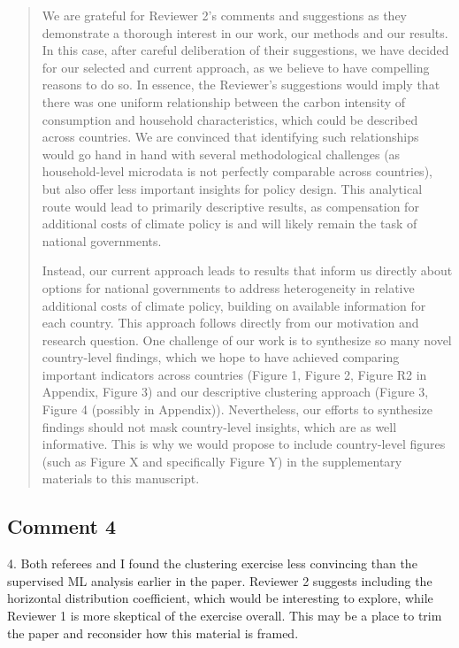 \documentclass[11pt]{article}
\newenvironment{response}
{\begin{quote}\color{black}}
{\end{quote}}
\begin{document}
\begin{response}
    We are grateful for Reviewer 2's comments and suggestions as they demonstrate a thorough interest in our work, our methods and our results. In this case, after careful deliberation of their suggestions, we have decided for our selected and current approach, as we believe to have compelling reasons to do so. In essence, the Reviewer's suggestions would imply that there was one uniform relationship between the carbon intensity of consumption and household characteristics, which could be described across countries. We are convinced that identifying such relationships would go hand in hand with several methodological challenges (as household-level microdata is not perfectly comparable across countries), but also offer less important insights for policy design. This analytical route would lead to primarily descriptive results, as compensation for additional costs of climate policy is and will likely remain the task of national governments.

    Instead, our current approach leads to results that inform us directly about options for national governments to address heterogeneity in relative additional costs of climate policy, building on available information for each country. This approach follows directly from our motivation and research question. One challenge of our work is to synthesize so many novel country-level findings, which we hope to have achieved comparing important indicators across countries (Figure 1, Figure 2, Figure R2 in Appendix, Figure 3) and our descriptive clustering approach (Figure 3, Figure 4 (possibly in Appendix)). Nevertheless, our efforts to synthesize findings should not mask country-level insights, which are as well informative. This is why we would propose to include country-level figures (such as Figure X and specifically Figure Y) in the supplementary materials to this manuscript. 
    

\end{response}

\subsection*{Comment 4}\label{comment_E_4}
\begin{commentbox}
    4. Both referees and I found the clustering exercise less convincing than the supervised ML analysis earlier in the paper. Reviewer 2 suggests including the horizontal distribution coefficient, which would be interesting to explore, while Reviewer 1 is more skeptical of the exercise overall. This may be a place to trim the paper and reconsider how this material is framed.
\end{commentbox}
\end{document}
